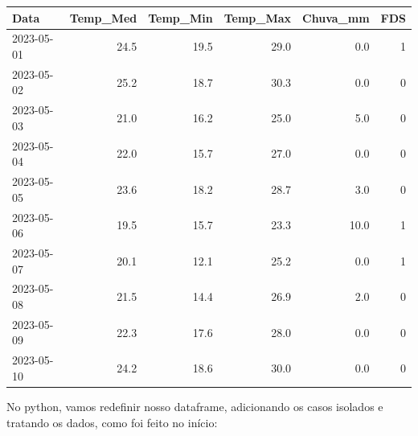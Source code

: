 \documentclass[a4paper, 12pt]{article}
\begin{document}
\begin{table}[h]
\centering
\begin{tabular}{@{}lrrrrr@{}}
\toprule
\textbf{Data} & \textbf{Temp\_Med} & \textbf{Temp\_Min} & \textbf{Temp\_Max} & \textbf{Chuva\_mm} & \textbf{FDS} \\ \midrule
2023-05-01    & 24.5               & 19.5               & 29.0               & 0.0                & 1            \\
2023-05-02    & 25.2               & 18.7               & 30.3               & 0.0                & 0            \\
2023-05-03    & 21.0               & 16.2               & 25.0               & 5.0                & 0            \\
2023-05-04    & 22.0               & 15.7               & 27.0               & 0.0                & 0            \\
2023-05-05    & 23.6               & 18.2               & 28.7               & 3.0                & 0            \\
2023-05-06    & 19.5               & 15.7               & 23.3               & 10.0               & 1            \\
2023-05-07    & 20.1               & 12.1               & 25.2               & 0.0                & 1            \\
2023-05-08    & 21.5               & 14.4               & 26.9               & 2.0                & 0            \\
2023-05-09    & 22.3               & 17.6               & 28.0               & 0.0                & 0            \\
2023-05-10    & 24.2               & 18.6               & 30.0               & 0.0                & 0            \\ \bottomrule
\end{tabular}
\end{table}


No python, vamos redefinir nosso dataframe, adicionando os casos isolados e tratando os dados, como foi feito no início:
\end{document}
